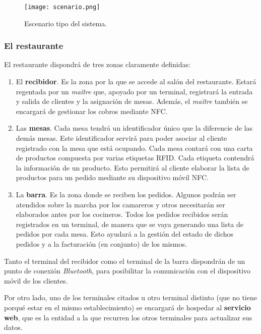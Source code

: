 \begin{figure}[!h]
  \begin{center}
    \texttt{[image: scenario.png]}
    \caption{Escenario tipo del sistema.}
    \label{fig:scenario}
  \end{center}
\end{figure}

    \subsubsection{El restaurante}
  El restaurante dispondrá de tres zonas claramente definidas:
  \begin{enumerate}
  \item El \textbf{recibidor}. Es la zona por la que se accede al salón del
  restaurante. Estará regentada por un \emph{maître} que, apoyado por un 
  terminal, registrará la entrada y salida de clientes y la asignación de 
  mesas. Además, el \emph{maître} también se encargará de gestionar los cobros 
  mediante \acs{NFC}.
  \item Las \textbf{mesas}. Cada mesa tendrá un identificador único que la
  diferencie de las demás mesas. Este identificador servirá para poder
  asociar al cliente registrado con la mesa que está ocupando. Cada mesa
  contará con una carta de productos compuesta por varias etiquetas
  \acs{RFID}. Cada etiqueta contendrá la información de un producto. Esto 
  permitirá al cliente elaborar la lista de productos para un pedido
  mediante su dispositivo móvil \acs{NFC}.
  \item La \textbf{barra}. Es la zona donde se reciben los pedidos. Algunos
  podrán ser atendidos sobre la marcha por los camareros y otros necesitarán
  ser elaborados antes por los cocineros. Todos los pedidos recibidos serán
  registrados en un terminal, de manera que se vaya generando una lista de
  pedidos por cada mesa. Esto ayudará a la gestión del estado de dichos 
  pedidos y a la facturación (en conjunto) de los mismos.
  \end{enumerate}

  Tanto el terminal del recibidor como el terminal de la barra dispondrán
  de un punto de conexión \emph{Bluetooth}, para posibilitar la comunicación
  con el dispositivo móvil de los clientes.

  Por otro lado, uno de los terminales citados u otro terminal distinto (que
  no tiene porqué estar en el mismo establecimiento) se encargará de hospedar
  al \textbf{servicio web}, que es la entidad a la que recurren los otros
  terminales para actualizar sus datos.

